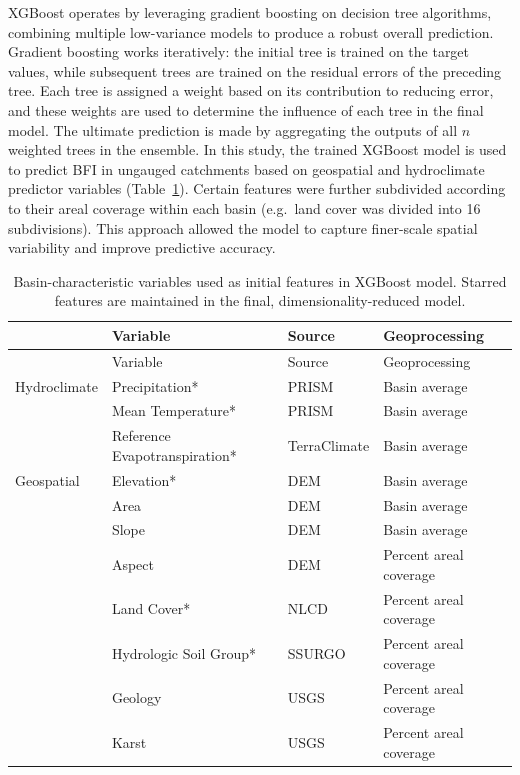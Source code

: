 \documentclass[
  authoryear,
  preprint,
  1p,
  onecolumn]{elsarticle}
\begin{document}
XGBoost operates by leveraging gradient boosting on decision tree
algorithms, combining multiple low-variance models to produce a robust
overall prediction. Gradient boosting works iteratively: the initial
tree is trained on the target values, while subsequent trees are trained
on the residual errors of the preceding tree. Each tree is assigned a
weight based on its contribution to reducing error, and these weights
are used to determine the influence of each tree in the final model. The
ultimate prediction is made by aggregating the outputs of all \(n\)
weighted trees in the ensemble. In this study, the trained XGBoost model
is used to predict BFI in ungauged catchments based on geospatial and
hydroclimate predictor variables (Table~\ref{tbl-predictors}). Certain
features were further subdivided according to their areal coverage
within each basin (e.g.~land cover was divided into 16 subdivisions).
This approach allowed the model to capture finer-scale spatial
variability and improve predictive accuracy.

\begin{longtable}[]{@{}llll@{}}
\caption{Basin-characteristic variables used as initial features in
XGBoost model. Starred features are maintained in the final,
dimensionality-reduced model.}\label{tbl-predictors}\tabularnewline
\toprule\noalign{}
& Variable & Source & Geoprocessing \\
\midrule\noalign{}
\endfirsthead
\toprule\noalign{}
& Variable & Source & Geoprocessing \\
\midrule\noalign{}
\endhead
\bottomrule\noalign{}
\endlastfoot
Hydroclimate & Precipitation* & PRISM & Basin average \\
& Mean Temperature* & PRISM & Basin average \\
& Reference Evapotranspiration* & TerraClimate & Basin average \\
Geospatial & Elevation* & DEM & Basin average \\
& Area & DEM & Basin average \\
& Slope & DEM & Basin average \\
& Aspect & DEM & Percent areal coverage \\
& Land Cover* & NLCD & Percent areal coverage \\
& Hydrologic Soil Group* & SSURGO & Percent areal coverage \\
& Geology & USGS & Percent areal coverage \\
& Karst & USGS & Percent areal coverage \\
\end{longtable}
\end{document}
